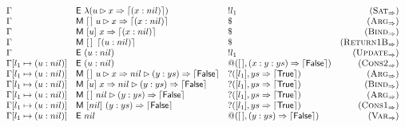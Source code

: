 \begin{figure*}
\[\begin{array}{lllr}
    \Gamma                                  & \textsf{E}~\lambda(u\rhd x \Rightarrow \left\lceil (x : nil)\right\rceil)    & !l_1                                       & (\textsc{Sat}_{\Rightarrow})      \\
    \Gamma                                  & \textsf{M}~[\,]~u\rhd x \Rightarrow \left\lceil (x : nil)\right\rceil       & \$                                         & (\textsc{Arg}_{\Rightarrow})      \\
    \Gamma                                  & \textsf{M}~[u]~x \Rightarrow \left\lceil (x : nil)\right\rceil                      & \$                                         & (\textsc{Bind}_{\Rightarrow})     \\
    \Gamma                                  & \textsf{M}~[\,]~\left\lceil (u : nil)\right\rceil                      & \$                                         & (\textsc{Return1B}_{\Rightarrow}) \\
    \Gamma                                  & \textsf{E}~(u : nil)                                           & !l_1                                       & (\textsc{Update}_{\Rightarrow})   \\
    \Gamma[l_1\mapsto(u : nil)]
                                            & \textsf{E}~(u : nil)                                           & @([\,],(x : y : ys) \Rightarrow \left\lceil \textsf{False}\right\rceil) & (\textsc{Cons2}_{\Rightarrow})    \\
    \Gamma[l_1\mapsto(u : nil)]             & \textsf{M}~[\,]~u\rhd x \Rightarrow nil\rhd (y : ys) \Rightarrow \left\lceil \textsf{False}\right\rceil
                                            & ?([l_1],ys \Rightarrow \left\lceil \textsf{True}\right\rceil)                           & (\textsc{Arg}_{\Rightarrow})                                                   \\
    \Gamma[l_1\mapsto(u : nil)]             & \textsf{M}~[u]~x \Rightarrow nil\rhd (y : ys) \Rightarrow \left\lceil \textsf{False}\right\rceil
                                            & ?([l_1],ys \Rightarrow \left\lceil \textsf{True}\right\rceil)                           & (\textsc{Bind}_{\Rightarrow})                                                  \\
    \Gamma[l_1\mapsto(u : nil)]             & \textsf{M}~[\,]~nil\rhd (y : ys) \Rightarrow \left\lceil \textsf{False}\right\rceil
                                            & ?([l_1],ys \Rightarrow \left\lceil \textsf{True}\right\rceil)                           & (\textsc{Arg}_{\Rightarrow})                                                   \\
    \Gamma[l_1\mapsto(u : nil)]             & \textsf{M}~[nil]~(y : ys) \Rightarrow \left\lceil \textsf{False}\right\rceil              & ?([l_1],ys \Rightarrow \left\lceil \textsf{True}\right\rceil)           & (\textsc{Cons1}_{\Rightarrow})    \\
    \Gamma[l_1\mapsto(u : nil)]             & \textsf{E}~nil                                                 & @([\,],(y : ys) \Rightarrow \left\lceil \textsf{False}\right\rceil)     & (\textsc{Var}_{\Rightarrow})      \\

\end{array}\]
\end{figure*}
